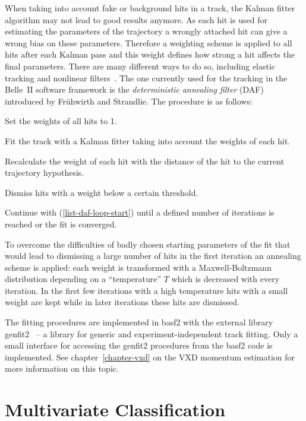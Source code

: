 When taking into account fake or background hits in a track, the Kalman fitter algorithm may not lead to good results anymore. As each hit is used for estimating the parameters of the trajectory a wrongly attached hit can give a wrong bias on these parameters. Therefore a weighting scheme is applied to all hits after each Kalman pass and this weight defines how strong a hit affects the final parameters. There are many different ways to do so, including elastic tracking and nonlinear filters~\cite{daf_fruh}. The one currently used for the tracking in the Belle~II software framework is the \emph{deterministic annealing filter} (DAF) introduced by Frühwirth and Strandlie. The procedure is as follows:
\begin{zlist}
  \item Set the weights of all hits to 1.
  \item Fit the track with a Kalman fitter taking into account the weights of each hit. \label{list-daf-loop-start}
  \item Recalculate the weight of each hit with the distance of the hit to the current trajectory hypothesis.
  \item Dismiss hits with a weight below a certain threshold.
  \item Continue with (\ref{list-daf-loop-start}) until a defined number of iterations is reached or the fit is converged.
\end{zlist}

To overcome the difficulties of badly chosen starting parameters of the fit that would lead to dismissing a large number of hits in the first iteration an annealing scheme is applied: each weight is transformed with a Maxwell-Boltzmann distribution depending on a ``temperature'' $T$ which is decreased with every iteration. In the first few iterations with a high temperature hits with a small weight are kept while in later iterations these hits are dismissed.

The fitting procedures are implemented in basf2 with the external library genfit2~\cite{genfit} -- a library for generic and experiment-independent track fitting. Only a small interface for accessing the genfit2 procedures from the basf2 code is implemented. See chapter~\ref{chapter-vxd} on the VXD momentum estimation for more information on this topic.

\section{Multivariate Classification}

